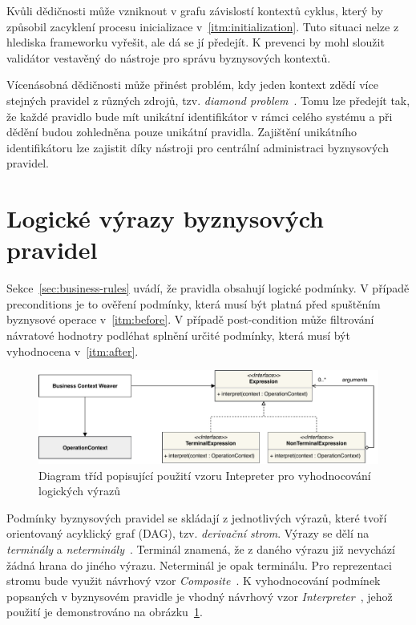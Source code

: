Kvůli dědičnosti může vzniknout v grafu závislostí kontextů cyklus, který by způsobil zacyklení
procesu inicializace v~\ref{itm:initialization}. Tuto situaci nelze z hlediska frameworku vyřešit,
ale dá se jí předejít. K prevenci by mohl sloužit validátor vestavěný do nástroje pro správu
byznysových kontextů.

Vícenásobná dědičnosti může přinést problém, kdy jeden kontext zdědí více stejných pravidel z
různých zdrojů, tzv. \textit{diamond problem}~\cite{boyen1994generalized}. Tomu lze předejít tak, že
každé pravidlo bude mít unikátní identifikátor v rámci celého systému a při dědění budou zohledněna
pouze unikátní pravidla. Zajištění unikátního identifikátoru lze zajistit díky nástroji pro centrální
administraci byznysových pravidel.

\section{Logické výrazy byznysových pravidel}

Sekce~\ref{sec:business-rules} uvádí, že pravidla obsahují logické podmínky. V případě preconditions je to
ověření podmínky, která musí být platná před spuštěním byznysové operace v~\ref{itm:before}. V případě
post-condition může filtrování návratové hodnotry podléhat splnění určité podmínky, která musí být
vyhodnocena v~\ref{itm:after}.

\begin{figure}
    \centering
    \includegraphics[keepaspectratio=true, width=1\linewidth]{figures/expression.pdf}
    \caption{Diagram tříd popisující použití vzoru Intepreter pro vyhodnocování logických výrazů}
    \label{fig:expression}
\end{figure}

Podmínky byznysových pravidel se skládají z jednotlivých výrazů, které tvoří
orientovaný acyklický graf (\gls{DAG}), tzv. \textit{derivační strom}.
Výrazy se dělí na \textit{terminály} a \textit{neterminály}~\cite{melichar2003jazyky}.
Terminál znamená, že z daného výrazu již nevychází žádná hrana do jiného výrazu.
Neterminál je opak terminálu. Pro reprezentaci stromu bude využit návrhový vzor
\textit{Composite}~\cite{fowler2002patterns}. K vyhodnocování podmínek popsaných v byznysovém
pravidle je vhodný návrhový vzor \textit{Interpreter}~\cite{fowler2002patterns}, jehož
použití je demonstrováno na obrázku~\ref{fig:expression}.

